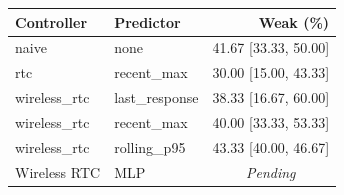 \begin{tabular}{llr}
\toprule
Controller & Predictor & Weak (\%) \\
\midrule
naive & none & 41.67 [33.33, 50.00] \\
rtc & recent\_max & 30.00 [15.00, 43.33] \\
wireless\_rtc & last\_response & 38.33 [16.67, 60.00] \\
wireless\_rtc & recent\_max & 40.00 [33.33, 53.33] \\
wireless\_rtc & rolling\_p95 & 43.33 [40.00, 46.67] \\
Wireless RTC & MLP & \multicolumn{1}{c}{\textit{Pending}} \\
\bottomrule
\end{tabular}
